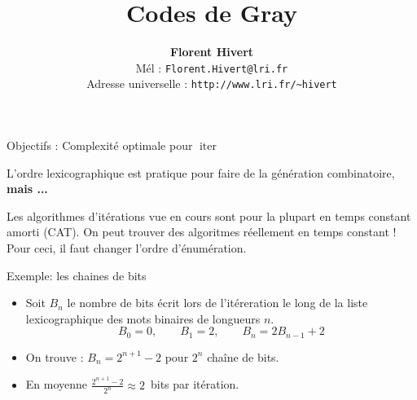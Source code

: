 \documentclass{beamer}
\title[Codes de Gray combinatoires]%
{\bf Codes de Gray}
\author{\textbf{\Large Florent Hivert}\\[5mm]
  Mél : \texttt{Florent.Hivert@lri.fr}\\
  Adresse universelle : \texttt{http://www.lri.fr/\~{ }hivert}
}
\date{}
\def\opstyle#1{\ensuremath{\operatorname{#1}}}
\begin{document}
\newcommand{\Count}{\opstyle{count}}
\newcommand{\List}{\opstyle{list}}
\newcommand{\Iter}{\opstyle{iter}}
\newcommand{\Unrank}{\opstyle{unrank}}
\newcommand{\Rank}{\opstyle{rank}}
\newcommand{\First}{\opstyle{first}}
\newcommand{\Next}{\opstyle{next}}
\newcommand{\Random}{\opstyle{random}}

\newcommand{\Concat}{\opstyle{concat}}
\newcommand{\BS}{\opstyle{BitString}}
\newcommand{\Perm}{\opstyle{Perm}}
\newcommand{\Union}{\opstyle{Union}}
\newcommand{\Prod}{\opstyle{Prod}}

\newcommand{\mA}{\mathcal{A}}
\newcommand{\mB}{\mathcal{B}}
\newcommand{\mC}{\mathcal{C}}
\newcommand{\mD}{\mathcal{D}}
\newcommand{\mE}{\mathcal{E}}
\newcommand{\mI}{\mathcal{I}}
\newcommand{\mZ}{\mathcal{Z}}

\newcommand{\Oh}{O}

\frame{\titlepage}
\begin{frame}{Objectifs : Complexité optimale pour $\Iter$}

  L'ordre lexicographique est pratique pour faire de la génération
  combinatoire, \textbf{mais ...}
  \bigskip

  \begin{NOTE}
    Les algorithmes d'itérations vue en cours sont pour la plupart en temps
    constant amorti (CAT). On peut trouver des algoritmes réellement en temps
    constant ! Pour ceci, il faut changer l'ordre d'énumération.
  \end{NOTE}
\end{frame}

\begin{frame}{Exemple: les chaines de bits}

  \begin{itemize}
  \item Soit $B_n$ le nombre de bits écrit lors de l'itéreration le long de la
    liste lexicographique des mots binaires de longueurs $n$.
  \[B_0 = 0,\qquad B_1=2,\qquad B_{n} = 2B_{n-1}+2\]
  \bigskip\pause

  \item On trouve : $B_n = 2^{n+1} - 2$ pour $2^n$ chaîne de bits.
  \bigskip\pause

  \item En moyenne $\frac{2^{n+1} - 2}{2^n}\approx 2$~bits par itération.
  \end{itemize}
\end{frame}
\end{document}
